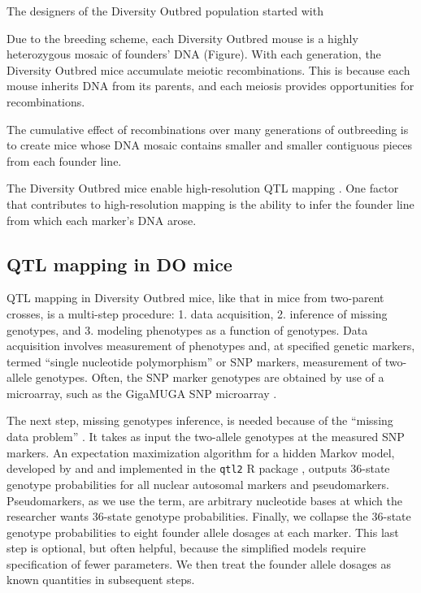 \documentclass[]{article}\usepackage[]{graphicx}\usepackage[]{color}
\begin{document}
The designers of the Diversity Outbred population started with 

Due to the breeding scheme, each Diversity Outbred mouse is a highly heterozygous mosaic of 
founders' DNA (Figure). 
With each generation, the Diversity Outbred mice accumulate meiotic recombinations. 
This is because each mouse inherits DNA from its parents, and each meiosis provides opportunities for recombinations. 

The cumulative effect of recombinations over many generations of outbreeding is to create mice whose DNA mosaic contains smaller and smaller contiguous pieces from each founder line. 

The Diversity Outbred mice enable high-resolution QTL mapping \citep{gatti2014quantitative}. One factor that contributes to high-resolution mapping is the ability to infer the founder line from which each marker's DNA arose. 




\subsection{QTL mapping in DO mice}

QTL mapping in Diversity Outbred mice, like that in mice from two-parent crosses, is a multi-step procedure: 1. data acquisition, 2. inference of missing genotypes, and 3. modeling phenotypes as a function of genotypes. Data acquisition involves measurement of phenotypes and, at specified genetic markers, termed ``single nucleotide polymorphism'' or SNP markers, measurement of two-allele genotypes. Often, the SNP marker genotypes are obtained by use of a microarray, such as the GigaMUGA SNP microarray \citep{morgan2015mouse}. 

The next step, missing genotypes inference, is needed because of the ``missing data problem'' \citep{broman2009guide}. It takes as input the two-allele genotypes at the measured SNP markers. An expectation maximization algorithm \citep{dempster1977maximum} for a hidden Markov model, developed by \citet{broman2012haplotype} and \citet{broman2012genotype} and implemented in the \texttt{qtl2} R package \citep{broman2019rqtl2}, outputs 36-state genotype probabilities for all nuclear autosomal markers and pseudomarkers. Pseudomarkers, as we use the term, are arbitrary nucleotide bases at which the researcher wants 36-state genotype probabilities. Finally, we collapse the 36-state genotype probabilities to eight founder allele dosages at each marker. This last step is optional, but often helpful, because the simplified models require specification of fewer parameters. We then treat the founder allele dosages as known quantities in subsequent steps. 
\end{document}
